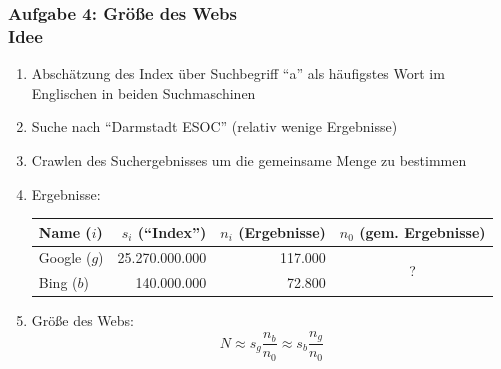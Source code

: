 \documentclass[accentcolor=tud7b,noresetcounter]{tudbeamer}
\begin{document}
  \begin{frame}
  	\frametitle{Aufgabe 4: Größe des Webs \\Idee}
  	\begin{enumerate}

  	 \item Abschätzung des Index über Suchbegriff "`a"' als häufigstes Wort im Englischen in beiden Suchmaschinen
  	 \item Suche nach "`Darmstadt ESOC"' (relativ wenige Ergebnisse)
  	 \item Crawlen des Suchergebnisses um die gemeinsame Menge zu bestimmen
  	 \item Ergebnisse:\\
  	 \begin{tabular}{|l|r|r|c|}
	  \hline
	  \textbf{Name ($i$)} & \textbf{$s_i$ ("`Index"')} & \textbf{$n_i$ (Ergebnisse)} & \textbf{$n_0$ (gem. Ergebnisse)}\\
	  \hline
	  Google ($g$) & 25.270.000.000 & 117.000 & \multirow{ 2}{*}{\Huge{?}}\\
	  Bing ($b$)  & 140.000.000 & 72.800 & \\
	  \hline
  	\end{tabular}
  	\item Größe des Webs:
  	$$N \approx s_g \frac{n_b}{n_0} \approx s_b \frac{n_g}{n_0}$$
  	\end{enumerate}
  \end{frame}
  \newenvironment{allintypewriter}{\ttfamily}{\par}
\end{document}
